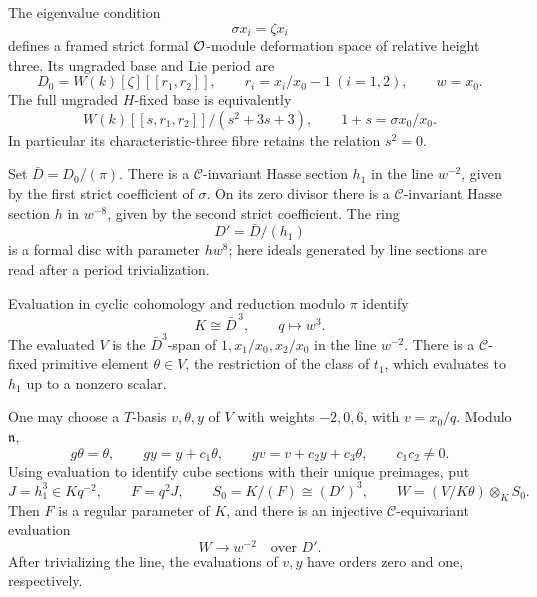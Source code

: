 \begin{theorem}\label{coef:fixed-geometry}
The eigenvalue condition
\[
 \sigma x_i=\zeta x_i
\]
defines a framed strict formal \(\mathcal O\)-module deformation space of
relative height three.  Its ungraded base and Lie period are
\[
 D_0=W(k)[\zeta][[r_1,r_2]],\qquad
 r_i=x_i/x_0-1\ (i=1,2),\qquad w=x_0.
\]
The full ungraded \(H\)-fixed base is equivalently
\begin{equation}\label{coef:nonreduced-fixed}
 W(k)[[s,r_1,r_2]]/(s^2+3s+3),\qquad 1+s=\sigma x_0/x_0.
\end{equation}
In particular its characteristic-three fibre retains the relation
\(s^2=0\).

Set \(\bar D=D_0/(\pi)\).  There is a
\(\mathcal C\)-invariant Hasse section \(h_1\) in the line \(w^{-2}\),
given by the first strict coefficient of \(\sigma\).
On its zero divisor there is a \(\mathcal C\)-invariant Hasse section
\(h\) in \(w^{-8}\), given by the second strict coefficient.
The ring
\[
 D'=\bar D/(h_1)
\]
is a formal disc with parameter \(hw^8\); here ideals generated by
line sections are read after a period trivialization.

Evaluation in cyclic cohomology and reduction modulo \(\pi\) identify
\[
 K\cong\bar D^{\,3},\qquad q\longmapsto w^3.
\]
The evaluated \(V\) is the \(\bar D^3\)-span of
\(1,x_1/x_0,x_2/x_0\) in the line \(w^{-2}\).
There is a \(\mathcal C\)-fixed primitive element
\(\theta\in V\), the restriction of the class of \(t_1\), which
evaluates to \(h_1\) up to a nonzero scalar.

One may choose a \(T\)-basis \(v,\theta,y\) of \(V\) with weights
\(-2,0,6\), with \(v=x_0/q\).  Modulo \(\mathfrak n\),
\begin{equation}\label{coef:jordan}
 g\theta=\theta,\qquad
 gy=y+c_1\theta,\qquad
 gv=v+c_2y+c_3\theta,\qquad c_1c_2\ne0.
\end{equation}
Using evaluation to identify cube sections with their unique
preimages, put
\[
 J=h_1^3\in Kq^{-2},\qquad F=q^2J,\qquad
 S_0=K/(F)\cong(D')^3,\qquad
 W=(V/K\theta)\otimes_K S_0.
\]
Then \(F\) is a regular parameter of \(K\), and there is an injective
\(\mathcal C\)-equivariant evaluation
\[
 W\longrightarrow w^{-2}\quad\text{over }D'.
\]
After trivializing the line, the evaluations of \(v,y\) have
orders zero and one, respectively.
\end{theorem}

